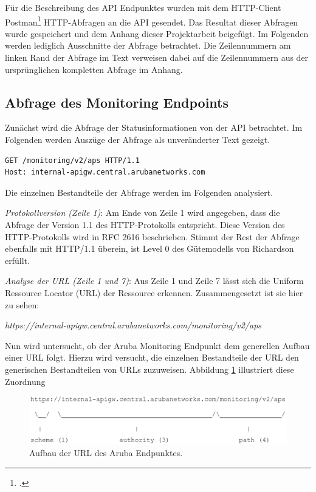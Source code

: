 Für die Beschreibung des API Endpunktes wurden mit dem HTTP-Client Postman\footcite{postman_inc_postman_2021} HTTP-Abfragen an die API gesendet. Das Resultat dieser Abfragen wurde gespeichert und dem Anhang dieser Projektarbeit beigefügt. Im Folgenden werden lediglich Ausschnitte der Abfrage betrachtet. Die Zeilennummern am linken Rand der Abfrage im Text verweisen dabei auf die Zeilennummern aus der ursprünglichen kompletten Abfrage im Anhang.

\subsection{Abfrage des Monitoring Endpoints}\label{subsection:abfrage-des-monitoring-endpunktes}

Zunächst wird die Abfrage der Statusinformationen von der API betrachtet. Im Folgenden werden Auszüge der Abfrage als unveränderter Text gezeigt.

\begin{lstlisting}
GET /monitoring/v2/aps HTTP/1.1
Host: internal-apigw.central.arubanetworks.com  
\end{lstlisting}

Die einzelnen Bestandteile der Abfrage werden im Folgenden analysiert.

\emph{Protokollversion (Zeile 1)}: Am Ende von Zeile 1 wird angegeben, dass die Abfrage der Version 1.1 des HTTP-Protokolls entspricht. Diese Version des HTTP-Protokolls wird in RFC 2616 beschrieben. Stimmt der Rest der Abfrage ebenfalls mit HTTP/1.1 überein, ist Level 0 des Gütemodells von Richardson erfüllt.

\emph{Analyse der URL (Zeile 1 und 7)}: Aus Zeile 1 und Zeile 7 lässt sich die Uniform Ressource Locator (URL) der Ressource erkennen. Zusammengesetzt ist sie hier zu sehen:

\emph{https://internal-apigw.central.arubanetworks.com/monitoring/v2/aps}

Nun wird untersucht, ob der Aruba Monitoring Endpunkt dem generellen Aufbau einer URL folgt. Hierzu wird versucht, die einzelnen Bestandteile der URL den generischen Bestandteilen von URLs zuzuweisen. Abbildung \ref{abb:AufbauArubaURL} illustriert diese Zuordnung

\begin{figure}[htb]
\centering
\includegraphics[width=12cm]{graphics/aufbau-aruba-url.png}
\caption[aufbau-aruba-url]{Aufbau der URL des Aruba Endpunktes.}
\label{abb:AufbauArubaURL}
\end{figure}

